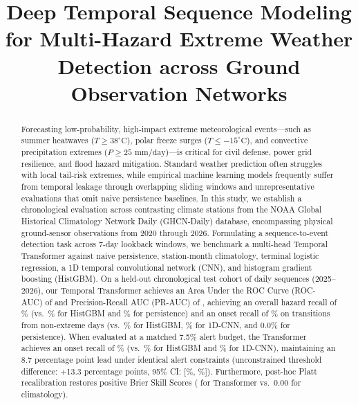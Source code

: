 \documentclass[conference]{IEEEtran}
\begin{document}
\title{Deep Temporal Sequence Modeling for Multi-Hazard Extreme Weather Detection across Ground Observation Networks}

\author{
\and
{}
}
\maketitle

\begin{abstract}
Forecasting low-probability, high-impact extreme meteorological events---such as summer heatwaves ($T \ge 38^\circ\text{C}$), polar freeze surges ($T \le -15^\circ\text{C}$), and convective precipitation extremes ($P \ge 25\text{ mm/day}$)---is critical for civil defense, power grid resilience, and flood hazard mitigation. Standard weather prediction often struggles with local tail-risk extremes, while empirical machine learning models frequently suffer from temporal leakage through overlapping sliding windows and unrepresentative evaluations that omit naive persistence baselines. In this study, we establish a chronological evaluation across \numStations{} contrasting climate stations from the NOAA Global Historical Climatology Network Daily (GHCN-Daily) database, encompassing \numClimateRecords{} physical ground-sensor observations from 2020 through 2026. Formulating a sequence-to-event detection task across 7-day lookback windows, we benchmark a multi-head Temporal Transformer against naive persistence, station-month climatology, terminal logistic regression, a 1D temporal convolutional network (CNN), and histogram gradient boosting (HistGBM). On a held-out chronological test cohort of \numTestSeq{} daily sequences (2025--2026), our Temporal Transformer achieves an Area Under the ROC Curve (ROC-AUC) of \aucDeep{} and Precision-Recall AUC (PR-AUC) of \prAucDeep{}, achieving an overall hazard recall of \recDeep{}\% (vs.~\recHgb{}\% for HistGBM and \recPers{}\% for persistence) and an onset recall of \onsetRecDeep{}\% on transitions from non-extreme days (vs.~\onsetRecHgb{}\% for HistGBM, \onsetRecCnn{}\% for 1D-CNN, and 0.0\% for persistence). When evaluated at a matched 7.5\% alert budget, the Transformer achieves an onset recall of \onsetRecMatchedDeep{}\% (vs.~\onsetRecMatchedHgb{}\% for HistGBM and \onsetRecMatchedCnn{}\% for 1D-CNN), maintaining an 8.7 percentage point lead under identical alert constraints (unconstrained threshold difference: +13.3 percentage points, 95\% CI: [\ciOnsetRecHgbLow{}\%, \ciOnsetRecHgbHigh{}\%]). Furthermore, post-hoc Platt recalibration restores positive Brier Skill Scores (\bssRecalDeep{} for Transformer vs.~0.00 for climatology).
\end{abstract}
\end{document}
